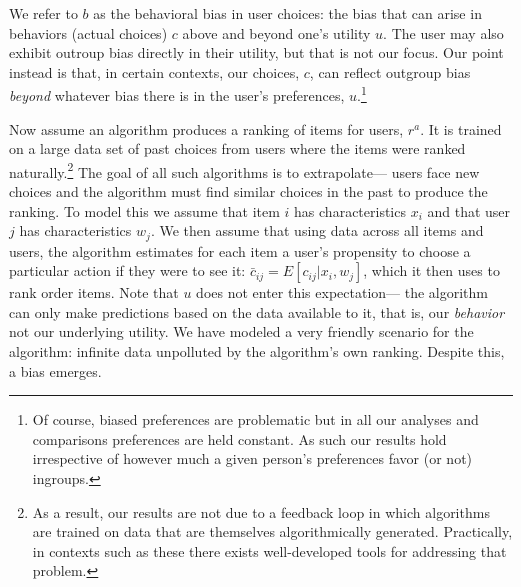 \documentclass[12pt,letterpaper]{article}
\begin{document}
We refer to $b$ as the behavioral bias in user choices: the bias that can arise in behaviors (actual choices) $c$ above and beyond one's utility $u$. The user may also exhibit outroup bias directly in their utility, but that is not our focus. Our point instead is that, in certain contexts, our choices, $c$, can reflect outgroup bias \emph{beyond} whatever bias there is in the user's preferences, $u$.\footnote{Of course, biased preferences are problematic but in all our analyses and comparisons preferences are held constant. As such our results hold irrespective of however much a given person's preferences favor (or not) ingroups.} 

Now assume an algorithm produces a ranking of items for users, $r^a$. It is trained on a large data set of past choices from users where the items were ranked naturally.\footnote{As a result, our results are not due to a feedback loop in which algorithms are trained on data that are themselves algorithmically generated. Practically, in contexts such as these there exists well-developed tools for addressing that problem.} The goal of all such algorithms is to extrapolate--- users face new choices and the algorithm must find similar choices in the past to produce the ranking. To model this we assume that item $i$ has characteristics $x_i$ and that user $j$ has characteristics $w_j$. We then assume that using data across all items and users, the algorithm estimates for each item a user's propensity to choose a particular action if they were to see it: $\bar{c}_{ij} = E[c_{ij}|x_i,w_j]$, which it then uses to rank order items. Note that $u$ does not enter this expectation--- the algorithm can only make predictions based on the data available to it, that is, our \emph{behavior} not our underlying utility. We have modeled a very friendly scenario for the algorithm: infinite data unpolluted by the algorithm's own ranking. Despite this, a bias emerges. 
\end{document}
